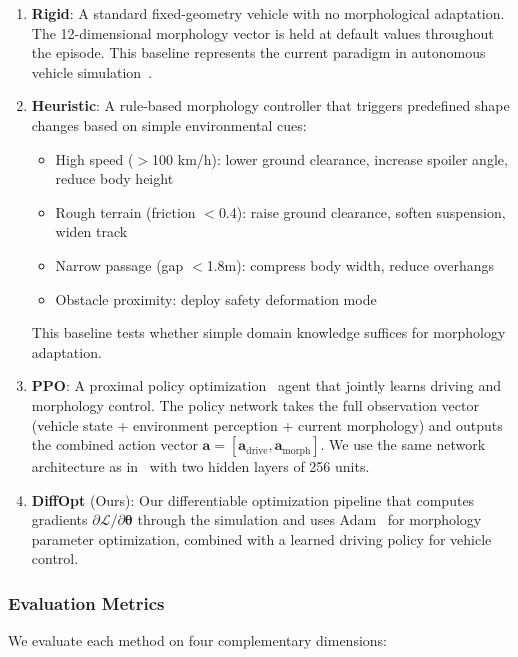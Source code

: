 \begin{enumerate}
    \item \textbf{Rigid}: A standard fixed-geometry vehicle with no morphological adaptation. The 12-dimensional morphology vector is held at default values throughout the episode. This baseline represents the current paradigm in autonomous vehicle simulation~\cite{dosovitskiy2017carla,makoviychuk2021isaac}.

    \item \textbf{Heuristic}: A rule-based morphology controller that triggers predefined shape changes based on simple environmental cues:
    \begin{itemize}
        \item High speed ($>$100 km/h): lower ground clearance, increase spoiler angle, reduce body height
        \item Rough terrain (friction $<$0.4): raise ground clearance, soften suspension, widen track
        \item Narrow passage (gap $<$1.8m): compress body width, reduce overhangs
        \item Obstacle proximity: deploy safety deformation mode
    \end{itemize}
    This baseline tests whether simple domain knowledge suffices for morphology adaptation.

    \item \textbf{PPO}: A proximal policy optimization~\cite{schulman2017proximal} agent that jointly learns driving and morphology control. The policy network takes the full observation vector (vehicle state + environment perception + current morphology) and outputs the combined action vector $\mathbf{a} = [\mathbf{a}_{\text{drive}}, \mathbf{a}_{\text{morph}}]$. We use the same network architecture as in~\cite{hwangbo2019learning} with two hidden layers of 256 units.

    \item \textbf{DiffOpt} (Ours): Our differentiable optimization pipeline that computes gradients $\partial \mathcal{L} / \partial \boldsymbol{\theta}$ through the simulation and uses Adam~\cite{kingma2015adam} for morphology parameter optimization, combined with a learned driving policy for vehicle control.
\end{enumerate}

\subsubsection{Evaluation Metrics}
We evaluate each method on four complementary dimensions:

